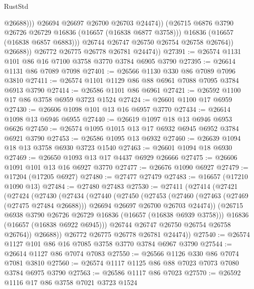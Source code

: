 \begin{lexlean}{RustStd}
\begin{coremodule}
                            @26688)))
                      @26694
                      @26697
                      @26700
                      @26703
                      @24474))
                  (@26715 @6876 @3790 @26726 @26729 @16836 (@16657 (@16838 @6877 @3758)))
                  @16836
                  (@16657 (@16838 @6857 @6883)))
                @26744
                @26747
                @26750
                @26754
                @26758
                @26764))
            @26688))
        @26772
        @26775
        @26778
        @26781
        @24474))
@27391 := @26574 @1131 @101 @86 @16 @7100 @3758 @3770 @3784 @6905 @3790
@27395 := @26614 @1131 @86 @7089 @7098
@27401 := @26566 @1130 @330 @86 @7089 @7096 @3810
@27411 := @26574 @1101 @1129 @86 @88 @6961 @7088 @7095 @3784 @6913 @3790
@27414 := @26586 @1101 @86 @6961
@27421 := @26592 @1100 @17 @86 @3758 @6959 @3723 @1524
@27424 := @26601 @1100 @17 @6959
@27430 := @26606 @1098 @101 @13 @16 @6957 @3770
@27434 := @26614 @1098 @13 @6946 @6955
@27440 := @26619 @1097 @18 @13 @6946 @6953 @6626
@27450 := @26574 @1095 @1015 @13 @17 @6932 @6945 @6952 @3784 @6921 @3790
@27453 := @26586 @1095 @13 @6932
@27460 := @26639 @1094 @18 @13 @3758 @6930 @3723 @1540
@27463 := @26601 @1094 @18 @6930
@27469 := @26650 @1093 @13 @17 @4437 @6929 @26666
@27475 := @26606 @1091 @101 @13 @16 @6927 @3770
@27477 := @26676 @1090 @6927
@27479 := @17204 (@17205 @6927)
@27480 := @27477 @27479
@27483 := @16657 (@17210 @1090 @13)
@27484 := @27480 @27483
@27530 := @27411
    (@27414
      (@27421
        (@27424
          (@27430
            (@27434
              (@27440
                (@27450
                  (@27453
                    (@27460
                      (@27463 (@27469 (@27475 @27484 @26688)))
                      @26694
                      @26697
                      @26700
                      @26703
                      @24474))
                  (@26715 @6938 @3790 @26726 @26729 @16836 (@16657 (@16838 @6939 @3758)))
                  @16836
                  (@16657 (@16838 @6922 @6945)))
                @26744
                @26747
                @26750
                @26754
                @26758
                @26764))
            @26688))
        @26772
        @26775
        @26778
        @26781
        @24474))
@27540 := @26574 @1127 @101 @86 @16 @7085 @3758 @3770 @3784 @6967 @3790
@27544 := @26614 @1127 @86 @7074 @7083
@27550 := @26566 @1126 @330 @86 @7074 @7081 @3810
@27560 := @26574 @1117 @1125 @86 @88 @7023 @7073 @7080 @3784 @6975 @3790
@27563 := @26586 @1117 @86 @7023
@27570 := @26592 @1116 @17 @86 @3758 @7021 @3723 @1524

\end{coremodule}
\end{lexlean}
